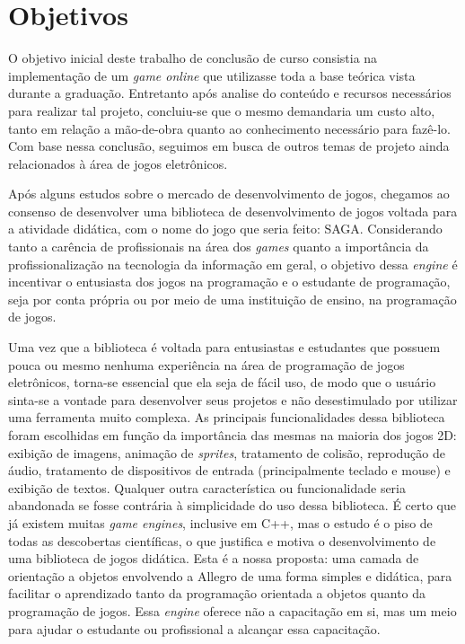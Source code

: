 \section{Objetivos}
\label{section:objetivos}

O objetivo inicial deste trabalho de conclusão de curso consistia na implementação de um \textit{game online} que utilizasse toda a base teórica vista durante a graduação. Entretanto após analise do conteúdo e recursos necessários para realizar tal projeto, concluiu-se que o mesmo demandaria um custo alto, tanto em relação a mão-de-obra quanto ao conhecimento necessário para fazê-lo. Com base nessa conclusão, seguimos em busca de outros temas de projeto ainda relacionados à área de jogos eletrônicos.

Após alguns estudos sobre o mercado de desenvolvimento de jogos, chegamos ao consenso de desenvolver uma biblioteca de desenvolvimento de jogos voltada para a atividade didática, com o nome do jogo que seria feito: SAGA. Considerando tanto a carência de profissionais na área dos \textit{games} quanto a importância da profissionalização na tecnologia da informação em geral, o objetivo dessa \textit{engine} é incentivar o entusiasta dos jogos na programação e o estudante de programação, seja por conta própria ou por meio de uma instituição de ensino, na programação de jogos. 

Uma vez que a biblioteca é voltada para entusiastas e estudantes que possuem pouca ou mesmo nenhuma experiência na área de programação de jogos eletrônicos, torna-se essencial que ela seja de fácil uso, de modo que o usuário sinta-se a vontade para desenvolver seus projetos e não desestimulado por utilizar uma ferramenta muito complexa. As principais funcionalidades dessa biblioteca foram escolhidas em função da importância das mesmas na maioria dos jogos 2D: exibição de imagens, animação de \textit{sprites}, tratamento de colisão, reprodução de áudio, tratamento de dispositivos de entrada (principalmente teclado e mouse) e exibição de textos. Qualquer outra característica ou funcionalidade seria abandonada se fosse contrária à simplicidade do uso dessa biblioteca.
%
É certo que já existem muitas \textit{game engines}, inclusive em C++, mas o estudo é o piso de todas as descobertas científicas, o que justifica e motiva o desenvolvimento de uma biblioteca de jogos didática. Esta é a nossa proposta: uma camada de orientação a objetos envolvendo a Allegro de uma forma simples e didática, para facilitar o aprendizado tanto da programação orientada a objetos quanto da programação de jogos. Essa \textit{engine} oferece não a capacitação em si, mas um meio para ajudar o estudante ou profissional a alcançar essa capacitação.
%
%
%

